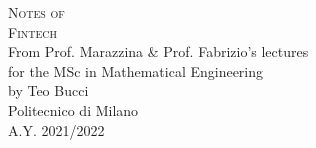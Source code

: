 \documentclass[10pt,a4paper]{book}
\begin{document}
\frontmatter

\pagestyle{empty}


\hypertarget{mytitlepage}{} %

\vspace*{\fill}

\begin{center}
	{\large \textsc{Notes of}}\\
	\vspace*{0.4cm}
	{\Huge \textsc{Fintech}}\\
	\vspace*{1cm}
	{\large {From Prof. Marazzina \& Prof. Fabrizio's lectures}}\\
	\vspace*{0.1cm}
	{\large for the MSc in Mathematical Engineering}\\
	\vspace*{0.4cm}
	{\large {by Teo Bucci}}\\
	\vspace*{1cm}
	Politecnico di Milano\\
	A.Y. 2021/2022
\end{center}
\vspace*{\fill}
\clearpage


\hypertarget{mycopyright}{} %

\clearpage


\hypertarget{mypreface}{} %

\clearpage


\cleardoublepage
\pagestyle{toc}
\hypertarget{mytoc}{} %
\bookmark[dest=mytoc,level=chapter]{\contentsname} %
\tableofcontents
\cleardoublepage


\pagestyle{fancy}
\mainmatter

 \cleardoublepage



\end{document}
